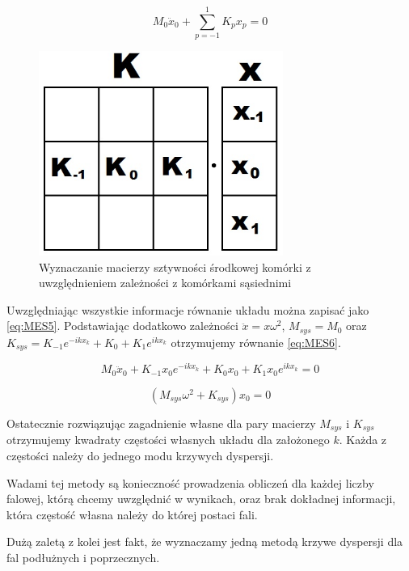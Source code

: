 \begin{equation} \label{eq:MES4}
M_0\ddot x_0 + \sum_{p=-1}^1 K_p x_p = 0
\end{equation}

\begin{figure}[h]
\centering
\includegraphics[width=8cm]{Zdjecia/2/metoda_numeryczna3_sztywnosc}
\caption{Wyznaczanie macierzy sztywności środkowej komórki z uwzględnieniem zależności z komórkami sąsiednimi}
\label{fig:komorki_preta_sztywnosc}
\end{figure}

Uwzględniając wszystkie informacje równanie układu można zapisać jako \ref{eq:MES5}. Podstawiając dodatkowo zależności \( \ddot x = x \omega^2 \), \( M_{sys} = M_0 \) oraz \( K_{sys} = K_{-1} e^{-ikx_k} + K_0 + K_1 e^{ikx_k} \) otrzymujemy równanie \ref{eq:MES6}.

\begin{equation} \label{eq:MES5}
M_0\ddot x_0 + K_{-1} x_0 e^{-ikx_k} + K_0 x_0 + K_1 x_0 e^{ikx_k} = 0
\end{equation}

\begin{equation} \label{eq:MES6}
 (M_{sys}\omega^2 + K_{sys})x_0 = 0
\end{equation}

Ostatecznie rozwiązując zagadnienie własne dla pary macierzy \( M_{sys} \) i \( K_{sys} \) otrzymujemy kwadraty częstości własnych układu dla założonego \( k \). Każda z częstości należy do jednego modu krzywych dyspersji.

Wadami tej metody są konieczność prowadzenia obliczeń dla każdej liczby falowej, którą chcemy uwzględnić w wynikach, oraz brak dokładnej informacji, która częstość własna należy do której postaci fali.

Dużą zaletą z kolei jest fakt, że wyznaczamy jedną metodą krzywe dyspersji dla fal podłużnych i poprzecznych.

